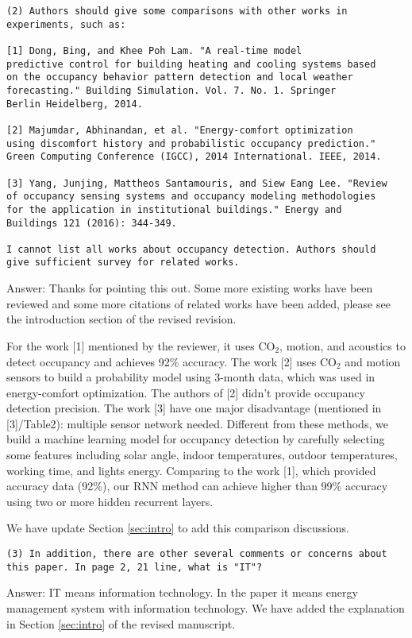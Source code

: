 \begin{verbatim}
(2) Authors should give some comparisons with other works in
experiments, such as:

[1] Dong, Bing, and Khee Poh Lam. "A real-time model
predictive control for building heating and cooling systems based
on the occupancy behavior pattern detection and local weather
forecasting." Building Simulation. Vol. 7. No. 1. Springer
Berlin Heidelberg, 2014.

[2] Majumdar, Abhinandan, et al. "Energy-comfort optimization
using discomfort history and probabilistic occupancy prediction."
Green Computing Conference (IGCC), 2014 International. IEEE, 2014.

[3] Yang, Junjing, Mattheos Santamouris, and Siew Eang Lee. "Review
of occupancy sensing systems and occupancy modeling methodologies
for the application in institutional buildings." Energy and
Buildings 121 (2016): 344-349.

I cannot list all works about occupancy detection. Authors should
give sufficient survey for related works.
\end{verbatim}

Answer: Thanks for pointing this out. Some more existing works have
been reviewed and some more citations of related works have been
added, please see the introduction section of the revised revision.

For the work [1] mentioned by the reviewer, it uses CO$_2$, motion,
and acoustics to detect occupancy and achieves 92\% accuracy. The work
[2] uses CO$_2$ and motion sensors to build a probability model using
3-month data, which was used in energy-comfort optimization. The
authors of [2] didn't provide occupancy detection precision. The work
[3] have one major disadvantage (mentioned in [3]/Table2): multiple
sensor network needed. Different from these methods, we build a
machine learning model for occupancy detection by carefully selecting
some features including solar angle, indoor temperatures, outdoor
temperatures, working time, and lights energy. Comparing to the work
[1], which provided accuracy data (92\%), our RNN method can achieve
higher than 99\% accuracy using two or more hidden recurrent layers.

We have update Section \ref{sec:intro} to add this comparison discussions.

\begin{verbatim}
(3) In addition, there are other several comments or concerns about
this paper. In page 2, 21 line, what is "IT"?
\end{verbatim}
Answer: IT means information technology. In the paper it means energy
management system with information technology. We have added the explanation in
Section \ref{sec:intro} of the revised manuscript.

